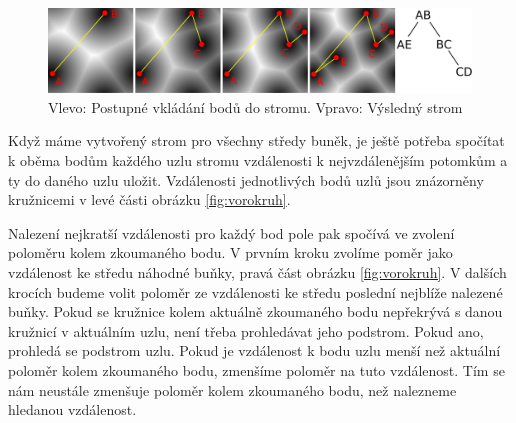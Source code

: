 \begin{figure}[h]
\centering
\includegraphics[width=15cm,keepaspectratio]{obr/vorostrom.pdf}
\caption{Vlevo: Postupné vkládání bodů do stromu. Vpravo: Výsledný strom}
\label{fig:vorostrom}
\end{figure}

Když máme vytvořený strom pro všechny středy buněk, je ještě potřeba spočítat k oběma bodům každého uzlu stromu vzdálenosti k nejvzdálenějším potomkům a ty do daného uzlu uložit.
Vzdálenosti jednotlivých bodů uzlů jsou znázorněny kružnicemi v levé části obrázku \ref{fig:vorokruh}.

Nalezení nejkratší vzdálenosti pro každý bod pole pak spočívá ve zvolení poloměru kolem zkoumaného bodu.
V prvním kroku zvolíme poměr jako vzdálenost ke středu náhodné buňky, pravá část obrázku \ref{fig:vorokruh}.
V dalších krocích budeme volit poloměr ze vzdálenosti ke středu poslední nejblíže nalezené buňky.
Pokud se kružnice kolem aktuálně zkoumaného bodu nepřekrývá s danou kružnicí v aktuálním uzlu, není třeba prohledávat jeho podstrom.
Pokud ano, prohledá se podstrom uzlu.
Pokud je vzdálenost k bodu uzlu menší než aktuální poloměr kolem zkoumaného bodu, zmenšíme poloměr na tuto vzdálenost.
Tím se nám neustále zmenšuje poloměr kolem zkoumaného bodu, než nalezneme hledanou vzdálenost.

